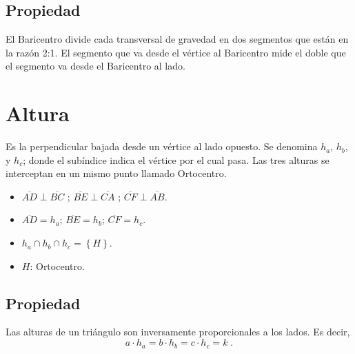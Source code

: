 \documentclass{sn-guia}
\begin{document}
\subsection*{Propiedad} 
El Baricentro divide cada transversal de gravedad en dos segmentos que están en la razón 2:1. El segmento que
va desde el vértice al Baricentro mide el doble que el segmento va desde el Baricentro al lado.

\section*{Altura}
Es la perpendicular bajada desde un vértice al lado opuesto. Se denomina $h_a$, $h_b$, y $h_c$; donde el
subíndice indica el vértice por el cual pasa. Las tres alturas se interceptan en un mismo punto llamado
Ortocentro.  

\begin{tcolorbox}
    \begin{center}
        \end{center}
    \tcblower
    \begin{itemize}
        \item $\overline{AD} \perp \overline{BC}$ ; $\overline{BE} \perp \overline{CA}$ ; $\overline{CF} \perp \overline{AB}$.
        \item $\overline{AD} = h_a$; $\overline{BE} = h_b$; $\overline{CF} = h_c$.
        \item $h_a \cap h_b \cap h_c = \left\{H\right\}$.
        \item $H$: Ortocentro.
    \end{itemize}
\end{tcolorbox}

\subsection*{Propiedad} 
Las alturas de un triángulo son inversamente proporcionales a los lados. Es decir,
\begin{equation*}
    a\cdot h_a = b\cdot h_b = c \cdot h_c = k\;.
\end{equation*}
\end{document}
